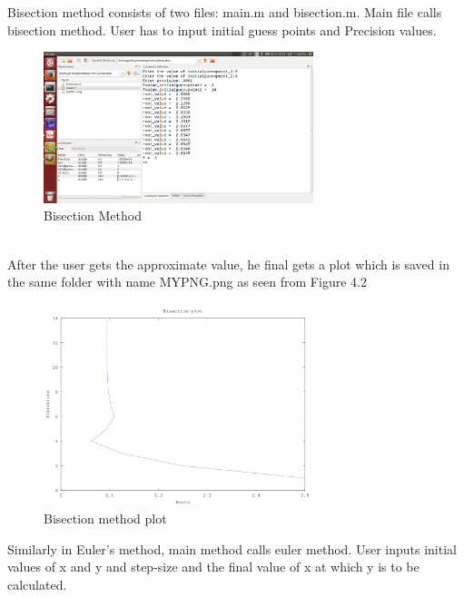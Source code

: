 Bisection method consists of two files: main.m and bisection.m.
Main file calls bisection method.
User has to input initial guess points and Precision values.\\
\begin{figure}[!ht]
	\centering
	\includegraphics[width=0.7\textwidth]{images/bisection.png}                
	\caption{Bisection Method}
	\hspace{-1.5em}
\end{figure}\\

\textnormal After the user gets the approximate value, he final gets a plot which is saved in the same folder with name MYPNG.png as seen from Figure 4.2\\

\begin{figure}[!ht]
	\centering
	\includegraphics[width=0.7\textwidth]{images/mypng.png}                
	\caption{Bisection method plot}
	\hspace{-1.5em}
\end{figure}
\newpage
\textnormal Similarly in Euler's method, main method calls euler method.
User inputs initial values of x and y and step-size and the final value of x at which y is to be calculated.\\

